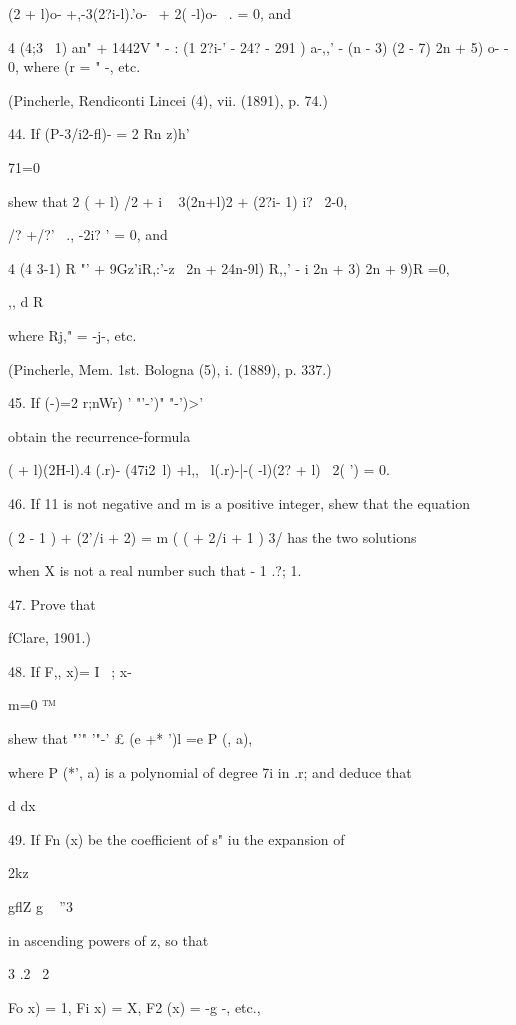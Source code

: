 {{{{(2 + l)o- +,-3(2?i-l).'o- \, + 2( -l)o- \ . = 0, and

4 (4;3 \ 1) an" + 1442V " - : (1 2?i-' - 24? - 291 ) a-,,' - (n - 3)
(2 - 7) 2n + 5) o- - 0, where (r = " -, etc.

(Pincherle, Rendiconti Lincei (4), vii. (1891), p. 74.)

44. If (P-3/i2-fl)- = 2 Rn z)h'\

71=0

shew that 2 ( + l) /2 + i ~ 3(2n+l)2 + (2?i- 1) i? \ 2-0,

 /? +/?' \ ., -2i? ' = 0, and

4 (4 3-1) R "' + 9Gz'iR,:'-z \ 2n + 24n-9l) R,,' - i 2n + 3) 2n + 9)R
=0,

,, d R

where Rj," = -j-, etc.

(Pincherle, Mem. 1st. Bologna (5), i. (1889), p. 337.)

%
%

45. If (-)=2 r;nWr) ' "'-')" "-')>'

obtain the recurrence-formula

( + l)(2H-l).4 (.r)- (47i2\ l) +l,, \ l(.r)-|-( -l)(2? + l) \ 2( ')
= 0.


46. If 11 is not negative and m is a positive integer, shew that the
equation

( 2 - 1 ) + (2'/i + 2) = m ( ( + 2/i + 1 ) 3/ has the two solutions

when X is not a real number such that - 1 .?; 1.

47. Prove that

fClare, 1901.)

48. If F,, x)= I ~; x-\

m=0 ™ 

shew that "'" '"-' £ (e +* ')l =e P (, a),

where P (*', a) is a polynomial of degree 7i in .r; and deduce that

d dx


49. If Fn (x) be the coefficient of s" iu the expansion of

2kz

gflZ g ~ ''3

in ascending powers of z, so that

3 .2 \ 2

Fo x) = 1, Fi x) = X, F2 (x) = -g -, etc.,

}}}}
